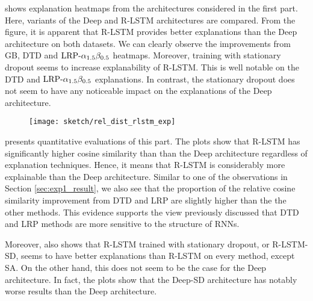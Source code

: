 \addfigure{\ref{fig:heatmap_msc_rlstm_exp}} shows explanation heatmaps from the architectures considered in the first part. Here, variants of the Deep and R-LSTM architectures are compared. From the figure, it is apparent that R-LSTM provides better explanations than the Deep architecture on both datasets. We can clearly observe the improvements from GB, DTD and $\text{LRP-}\alpha_{1.5}\beta_{0.5}$ heatmaps. Moreover, training with stationary dropout seems to increase explanability of  R-LSTM. This is well notable on the DTD and $\text{LRP-}\alpha_{1.5}\beta_{0.5}$ explanations. In contrast, the stationary dropout does not seem to have any noticeable impact on the explanations of the Deep architecture.


 \begin{figure}[!htb]
\centering
\texttt{[image: sketch/rel\_dist\_rlstm\_exp]}

\label{fig:rel_dist_rlstm_exp}
\end{figure}

\addfigure{\ref{fig:rel_dist_rlstm_exp}} presents quantitative evaluations of this part. The plots show that  R-LSTM has significantly higher cosine similarity than than the Deep architecture regardless of explanation techniques.  Hence, it means that R-LSTM is considerably  more explainable than the Deep architecture. Similar to one of the observations in Section \ref{sec:exp1_result}, we also see that the proportion of  the relative cosine similarity improvement from DTD and LRP are slightly higher than the the other methods. This evidence supports the view previously discussed that DTD and LRP methods are more sensitive to the structure of RNNs.

Moreover, \addfigure{\ref{fig:rel_dist_rlstm_exp}}  also shows that  R-LSTM trained with stationary dropout, or R-LSTM-SD, seems to have better explanations than R-LSTM on every method, except SA. On the other hand, this does not seem to be the case for the Deep architecture. In fact, the plots show that the Deep-SD architecture has notably worse results than the Deep architecture.



